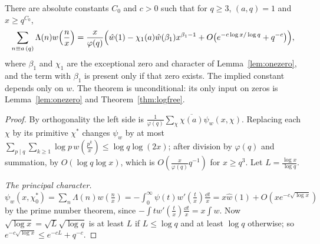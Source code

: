 \begin{theorem}[Gallagher, 1970]\label{thm:gallagher}
There are absolute constants $C_0$ and $c>0$ such that for $q\ge3$, $(a,q)=1$ and $x\ge q^{C_0}$,
\[
\sum_{n\equiv a\,(q)}\Lambda(n)w\Bigl(\frac nx\Bigr)=\frac x{\varphi(q)}\Bigl(\hat w(1)-\chi_1(a)\hat w(\beta_1)x^{\beta_1-1}+O\bigl(e^{-c\log x/\log q}+q^{-c}\bigr)\Bigr),
\]
where $\beta_1$ and $\chi_1$ are the exceptional zero and character of Lemma~\ref{lem:onezero}, and the term with $\beta_1$ is present only if that zero exists. The implied constant depends only on $w$. The theorem is unconditional: its only input on zeros is Lemma~\ref{lem:onezero} and Theorem~\ref{thm:logfree}.
\end{theorem}
\begin{proof}
By orthogonality the left side is $\frac1{\varphi(q)}\sum_\chi\overline{\chi(a)}\psi_w(x,\chi)$. Replacing each $\chi$ by its primitive $\chi^*$ changes $\psi_w$ by at most $\sum_{p\mid q}\sum_{k\ge1}\log p\,w(\frac{p^k}x)\le\log q\log(2x)$; after division by $\varphi(q)$ and summation, by $O(\log q\log x)$, which is $O(\frac x{\varphi(q)}q^{-1})$ for $x\ge q^3$. Let $L=\frac{\log x}{\log q}$.

\emph{The principal character.} $\psi_w(x,\chi_0^*)=\sum_n\Lambda(n)w(\frac nx)=-\int_0^\infty\psi(t)w'(\frac tx)\frac{\dd t}x=x\hat w(1)+O(xe^{-c\sqrt{\log x}})$ by the prime number theorem, since $-\int tw'(\frac tx)\frac{\dd t}x=x\int w$. Now $\sqrt{\log x}=\sqrt{L}\sqrt{\log q}$ is at least $L$ if $L\le\log q$ and at least $\log q$ otherwise; so $e^{-c\sqrt{\log x}}\le e^{-cL}+q^{-c}$.


\end{proof}
